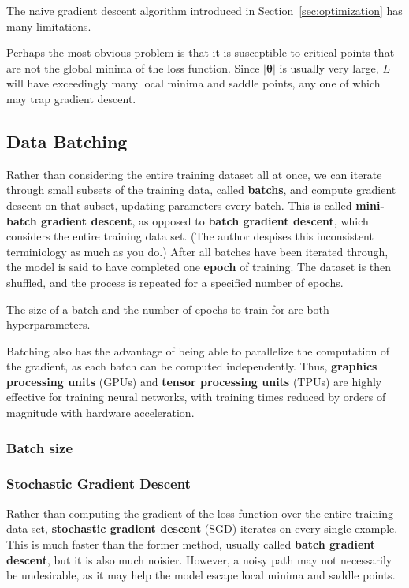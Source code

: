 \documentclass[12pt]{report}
\theoremstyle{definition}
\theoremstyle{remark}
\begin{document}
The naive gradient descent algorithm introduced in Section~\ref{sec:optimization} has many limitations.

Perhaps the most obvious problem is that it is susceptible to critical points that are not the global minima of the loss function. Since $|\boldsymbol{\theta}|$ is usually very large, $L$ will have exceedingly many local minima and saddle points, any one of which may trap gradient descent.

\subsection{Data Batching}

Rather than considering the entire training dataset all at once, we can iterate through small subsets of the training data, called \textbf{\glspl{batch}}, and compute gradient descent on that subset, updating parameters every batch. This is called \textbf{mini-batch gradient descent}, as opposed to \textbf{batch gradient descent}, which considers the entire training data set. (The author despises this inconsistent terminiology as much as you do.) After all batches have been iterated through, the model is said to have completed one \textbf{epoch} of training. The dataset is then shuffled, and the process is repeated for a specified number of epochs.

The size of a batch and the number of epochs to train for are both hyperparameters.

Batching also has the advantage of being able to parallelize the computation of the gradient, as each batch can be computed independently. Thus, \textbf{graphics processing units} (GPUs) and \textbf{tensor processing units} (TPUs) are highly effective for training neural networks, with training times reduced by orders of magnitude with hardware acceleration.

\subsubsection{Batch size}



\subsubsection{Stochastic Gradient Descent}


Rather than computing the gradient of the loss function over the entire training data set, \textbf{stochastic gradient descent} (SGD) iterates on every single example. This is much faster than the former method, usually called \textbf{batch gradient descent}, but it is also much noisier. However, a noisy path may not necessarily be undesirable, as it may help the model escape local minima and saddle points.
\end{document}
